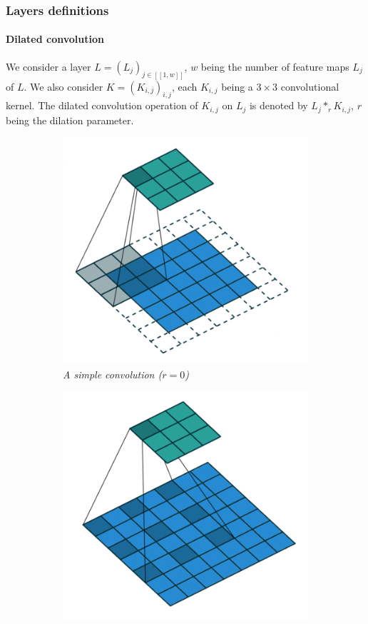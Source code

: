 \documentclass{article}
\begin{document}
        \subsubsection{Layers definitions}

            \paragraph{Dilated convolution} We consider a layer $L=(L_j)_{j\in [\![1,w]\!]}$, $w$ being the number of feature maps $L_j$ of $L$. We also consider $K=(K_{i,j})_{i,j}$, each $K_{i,j}$ being a $3\times 3$ convolutional kernel. The dilated convolution operation of $K_{i,j}$ on $L_j$ is denoted by $L_j*_r K_{i,j}$, $r$ being the dilation parameter.
            \begin{figure}
                \begin{subfigure}{.49\linewidth}
                    \centering
                    \includegraphics[width=.8\linewidth]{pics/conv-simple.png}
                    \caption{\textit{A simple convolution ($r=0$)}}
                    \label{fig:conv-simple}
                \end{subfigure}
                \begin{subfigure}{.49\linewidth}
                    \centering
                    \includegraphics[width=.8\linewidth]{pics/conv-dilated.png}

\end{subfigure}
\end{figure}
\end{document}

